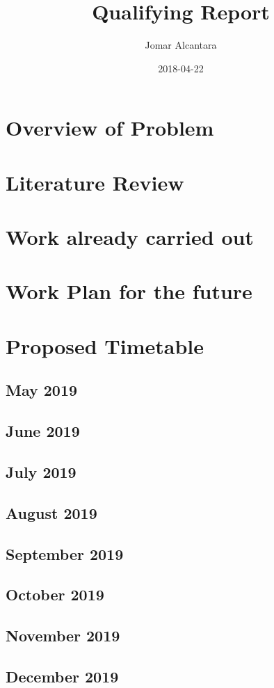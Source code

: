 \documentclass{article}
\title{Qualifying Report}
\date{2018-04-22}
\author{Jomar Alcantara}
\begin{document}
	\section{Overview of Problem}
	\section{Literature Review}
	\section{Work already carried out}
	\section{Work Plan for the future}
	\section{Proposed Timetable}
	\subsection{May 2019}
	
	\subsection{June 2019}
	
	\subsection{July 2019}
	
	\subsection{August 2019}
	
	\subsection{September 2019}
	
	\subsection{October 2019}
	
	\subsection{November 2019}
	
	\subsection{December 2019}
	
\end{document}
